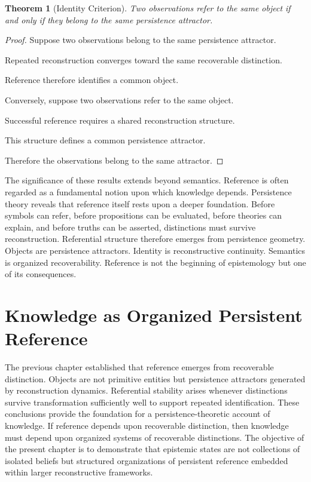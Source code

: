 \documentclass[12pt,oneside]{article}
\newtheorem{theorem}{Theorem}[section] \newtheorem{lemma}[theorem]{Lemma} \newtheorem{proposition}[theorem]{Proposition} \newtheorem{corollary}[theorem]{Corollary}
\theoremstyle{definition}
\begin{document}
\begin{theorem}[Identity Criterion]

Two observations refer to the same object if and only if they belong to the same persistence attractor.

\end{theorem}

\begin{proof}

Suppose two observations belong to the same persistence attractor.

Repeated reconstruction converges toward the same recoverable distinction.

Reference therefore identifies a common object.

Conversely, suppose two observations refer to the same object.

Successful reference requires a shared reconstruction structure.

This structure defines a common persistence attractor.

Therefore the observations belong to the same attractor.

\end{proof}

The significance of these results extends beyond semantics. Reference is often regarded as a fundamental notion upon which knowledge depends. Persistence theory reveals that reference itself rests upon a deeper foundation. Before symbols can refer, before propositions can be evaluated, before theories can explain, and before truths can be asserted, distinctions must survive reconstruction. Referential structure therefore emerges from persistence geometry. Objects are persistence attractors. Identity is reconstructive continuity. Semantics is organized recoverability. Reference is not the beginning of epistemology but one of its consequences.

\section{Knowledge as Organized Persistent Reference}

The previous chapter established that reference emerges from recoverable distinction. Objects are not primitive entities but persistence attractors generated by reconstruction dynamics. Referential stability arises whenever distinctions survive transformation sufficiently well to support repeated identification. These conclusions provide the foundation for a persistence-theoretic account of knowledge. If reference depends upon recoverable distinction, then knowledge must depend upon organized systems of recoverable distinctions. The objective of the present chapter is to demonstrate that epistemic states are not collections of isolated beliefs but structured organizations of persistent reference embedded within larger reconstructive frameworks.
\end{document}
